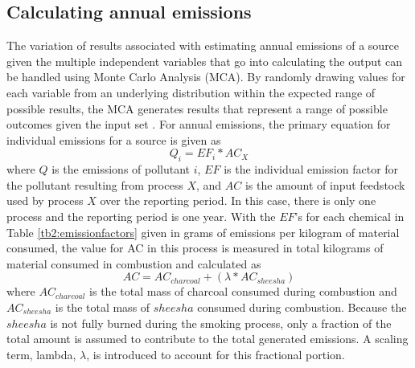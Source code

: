 \subsection{Calculating annual emissions}

The variation of results associated with estimating annual emissions of a source given the multiple independent variables that go into calculating the output can be handled using Monte Carlo Analysis (MCA).  By randomly drawing values for each variable from an underlying distribution within the expected range of possible results, the MCA generates results that represent a range of possible outcomes given the input set \citep{Johnson2011}.  For annual emissions, the primary equation for individual emissions for a source is given as
%
\begin{equation}
\label{eq1}
Q_{i} = EF_{i} * AC_{X}
\end{equation}
%
\noindent
where $Q$ is the emissions of pollutant $i$, $EF$ is the individual emission factor for the pollutant resulting from process $X$, and $AC$ is the amount of input feedstock used by process $X$ over the reporting period.  In this case, there is only one process and the reporting period is one year.  With the $EF$’s for each chemical in Table \ref{tb2:emissionfactors} given in grams of emissions per kilogram of material consumed, the value for AC in this process is measured in total kilograms of material consumed in combustion and calculated as
%
\begin{equation}
\label{eq2}
AC = AC_{charcoal} + ( \lambda * AC_{sheesha} )
\end{equation}
%
\noindent
where $AC_{charcoal}$ is the total mass of charcoal consumed during combustion and $AC_{sheesha}$ is the total mass of $sheesha$ consumed during combustion.  Because the $sheesha$ is not fully burned during the smoking process, only a fraction of the total amount is assumed to contribute to the total generated emissions.  A scaling term, lambda, $\lambda$, is introduced to account for this fractional portion. 

